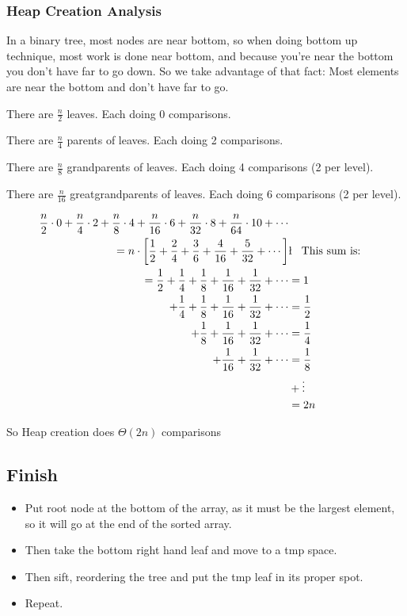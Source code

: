 \documentclass[english, 10pt]{article}
\begin{document}
\subsubsection{Heap Creation Analysis}
In a binary tree, most nodes are near bottom, so when doing bottom up technique, most
work is done near bottom, and because you're near the bottom you don't have far
to go down. So we take advantage of that fact: Most elements are near the
bottom and don't have far to go.

There are $ \frac{n}{2}$ leaves. Each doing 0 comparisons.

There are $ \frac{n}{4}$ parents of leaves. Each doing 2 comparisons.

There are $ \frac{n}{8}$ grandparents of leaves. Each doing 4 comparisons (2 per level).

There are $ \frac{n}{16}$ greatgrandparents of leaves. Each doing 6 comparisons (2 per level).

\begin{align*}
\frac{n}{2}\cdot0 + \frac{n}{4}\cdot2 + \frac{n}{8}\cdot4 + \frac{n}{16}\cdot6 +\frac{n}{32}\cdot8 + \frac{n}{64}\cdot10 + \cdots \\
= n\cdot\left[ \frac{1}{2} + \frac{2}{4} + \frac{3}{6} + \frac{4}{16} + \frac{5}{32} + \cdots \right]&\l\;\;\;\text{This sum is:} \\
= \frac{1}{2}+\frac{1}{4}+\frac{1}{8}+\frac{1}{16}+\frac{1}{32}+\cdots &= 1 \\
+ \frac{1}{4}+\frac{1}{8}+\frac{1}{16}+\frac{1}{32}+\cdots &= \frac{1}{2} \\
+ \frac{1}{8}+\frac{1}{16}+\frac{1}{32}+\cdots &= \frac{1}{4} \\
+ \frac{1}{16}+\frac{1}{32}+\cdots &=\frac{1}{8} \\
&+\vdots \\
&=2n
\end{align*}

So Heap creation does $\Theta(2n)$ comparisons

\subsection{Finish}
\begin{itemize}
    \item Put root node at the bottom of the array, as it must be the largest element, so
        it will go at the end of the sorted array.
    \item Then take the bottom right hand leaf and move to a tmp space.
    \item Then sift, reordering the tree and put the tmp leaf in its proper spot.
    \item Repeat.
\end{itemize}
\end{document}
